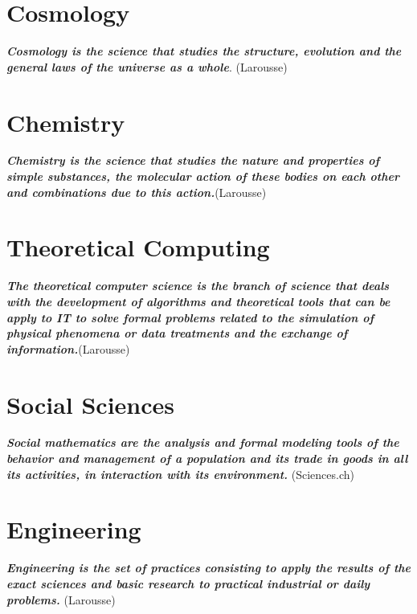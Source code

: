 \documentclass[12pt,a4paper,twoside,openright]{report}
\theoremstyle{definition}
\theoremstyle{itexmp}
\numberwithin{equation}{section}
\begin{document}
\chapter{Cosmology}

	\textit{\textbf{Cosmology is the science that studies the structure, evolution and the general laws of the universe as a whole}}. (Larousse)
	\minitoc
	\pagebreak
	

	
\chapter{Chemistry}

	\textit{\textbf{Chemistry is the science that studies the nature and properties of simple substances, the molecular action of these bodies on each other and combinations due to this action.}}(Larousse)
	\minitoc
	\pagebreak 
	
	
	
\chapter{Theoretical Computing}

	\textit{\textbf{The theoretical computer science is the branch of science that deals with the development of algorithms and theoretical tools that can be apply to IT to solve formal problems related to the simulation of physical phenomena or data treatments and the exchange of information.}}(Larousse)
	\minitoc
	\pagebreak 
	
	
	
\chapter{Social Sciences}

	\textit{\textbf{Social mathematics are the analysis and formal modeling tools of the behavior and management of a population and its trade in goods in all its activities, in interaction with its environment.}} (Sciences.ch)
	\minitoc
	\pagebreak
	
	
		
\chapter{Engineering}

	\textit{\textbf{Engineering is the set of practices consisting to apply the results of the exact sciences and basic research to practical industrial or daily problems.}} (Larousse)
	\minitoc
	\pagebreak
	
\end{document}
